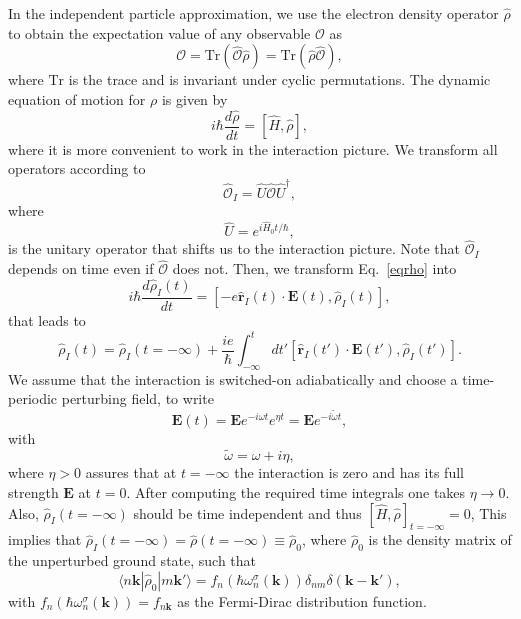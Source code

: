 In the independent particle approximation, we use the electron density
operator $\hat{\rho}$ to obtain the expectation value of any observable
$\mathcal{O}$ as
\begin{equation}\label{traza}
\mathcal{O}=\mathrm{Tr}(\hat{\mathcal{O}}\hat{\rho})=\mathrm{Tr}(\hat{\rho}\hat{\mathcal{O}}),
\end{equation}
where $\mathrm{Tr}$ is the trace and is invariant under cyclic permutations.
The dynamic equation of motion for $\rho$ is given by
\begin{equation}\label{eqrho}
i\hbar \frac{d\hat{\rho}}{dt}=[\hat{H},\hat{\rho}]
,
\end{equation}
where it is more convenient to work in the interaction picture. We transform 
all operators according to 
\begin{equation}\label{ip}
\hat{\mathcal{O}}_I=\hat{U}\hat{\mathcal{O}}\hat{U}^\dagger,
\end{equation}
where
\begin{equation}\label{ou}
\hat{U}=e^{i\hat{H}_0t/\hbar},
\end{equation}
is the unitary operator that shifts us to the interaction picture.
Note that $\hat{\mathcal{O}}_I$ depends on time even if $\hat{\mathcal{O}}$ does not.
Then, we transform Eq.~\eqref{eqrho} into
\begin{equation}\label{intrho}
i\hbar\frac{d\hat{\rho}_I(t)}{dt}=[-e\hat{\mathbf{r}}_I(t)\cdot\mathbf{E}(t),\hat{\rho}_I(t)],
\end{equation}
that leads to
\begin{equation}\label{intrho2}
\hat{\rho}_I(t)=\hat{\rho}_I(t=-\infty)
+
\frac{ie}{\hbar}\int_{-\infty}^t dt'[\hat{\mathbf{r}}_I(t')\cdot\mathbf{E}(t'),\hat{\rho}_I(t')].
\end{equation}
We assume that the interaction is switched-on adiabatically and
choose a time-periodic perturbing field, to write
\begin{equation}\label{efield}
\mathbf{E}(t)=\mathbf{E} e^{-i\omega t}e^{\eta t}=\mathbf{E} e^{-i\tilde{\omega} t}
,
\end{equation}
with
\begin{equation}\label{got}
\tilde{\omega}=\omega+i\eta
,
\end{equation} 
where $\eta > 0$ assures
that at $t=-\infty$ the interaction is zero and has its full strength $\mathbf{E}$ 
at $t=0$. After computing the required time integrals one takes
$\eta\to 0$. 
Also, $\hat{\rho}_I(t=-\infty)$ should be time independent and thus 
$[\hat{H},\hat{\rho}]_{t=-\infty}=0$, This implies that 
$\hat{\rho}_I(t=-\infty)=\hat{\rho}(t=-\infty)\equiv\hat{\rho}_0$,
where $\hat{\rho}_0$ is
the density matrix of the unperturbed ground state,
such that
\begin{equation}\label{nrhon}
\langle n\mathbf{k}| \hat{\rho}_{0} |m\mathbf{k}'\rangle = f_{n}(\hbar\omega^{\sigma}_{n}(\mathbf{k}))\delta_{nm}\delta(\mathbf{k}-\mathbf{k}')
,
\end{equation}
with $f_{n}(\hbar\omega^{\sigma}_{n}(\mathbf{k}))=f_{n\mathbf{k}}$ as the Fermi-Dirac distribution function.


